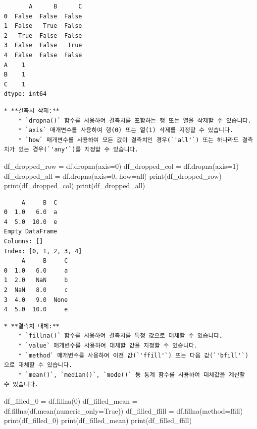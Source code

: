 \documentclass[
  letterpaper,
]{book}
\newenvironment{Shaded}{\begin{snugshade}}{\end{snugshade}}
\newcommand{\BuiltInTok}[1]{\textcolor[rgb]{0.00,0.23,0.31}{#1}}
\newcommand{\DecValTok}[1]{\textcolor[rgb]{0.68,0.00,0.00}{#1}}
\newcommand{\NormalTok}[1]{\textcolor[rgb]{0.00,0.23,0.31}{#1}}
\newcommand{\OperatorTok}[1]{\textcolor[rgb]{0.37,0.37,0.37}{#1}}
\newcommand{\StringTok}[1]{\textcolor[rgb]{0.13,0.47,0.30}{#1}}
\newcommand{\VariableTok}[1]{\textcolor[rgb]{0.07,0.07,0.07}{#1}}
\begin{document}
\begin{verbatim}
       A      B      C
0  False  False  False
1  False   True  False
2   True  False  False
3  False  False   True
4  False  False  False
A    1
B    1
C    1
dtype: int64
\end{verbatim}

\begin{verbatim}
* **결측치 삭제:**
    * `dropna()` 함수를 사용하여 결측치를 포함하는 행 또는 열을 삭제할 수 있습니다.
    * `axis` 매개변수를 사용하여 행(0) 또는 열(1) 삭제를 지정할 수 있습니다.
    * `how` 매개변수를 사용하여 모든 값이 결측치인 경우(`'all'`) 또는 하나라도 결측치가 있는 경우(`'any'`)를 지정할 수 있습니다.
\end{verbatim}

\begin{Shaded}
\begin{Highlighting}[]
\NormalTok{    df\_dropped\_row }\OperatorTok{=}\NormalTok{ df.dropna(axis}\OperatorTok{=}\DecValTok{0}\NormalTok{)}
\NormalTok{    df\_dropped\_col }\OperatorTok{=}\NormalTok{ df.dropna(axis}\OperatorTok{=}\DecValTok{1}\NormalTok{)}
\NormalTok{    df\_dropped\_all }\OperatorTok{=}\NormalTok{ df.dropna(axis}\OperatorTok{=}\DecValTok{0}\NormalTok{, how}\OperatorTok{=}\StringTok{\textquotesingle{}all\textquotesingle{}}\NormalTok{)}
    \BuiltInTok{print}\NormalTok{(df\_dropped\_row)}
    \BuiltInTok{print}\NormalTok{(df\_dropped\_col)}
    \BuiltInTok{print}\NormalTok{(df\_dropped\_all)}
\end{Highlighting}
\end{Shaded}

\begin{verbatim}
     A     B  C
0  1.0   6.0  a
4  5.0  10.0  e
Empty DataFrame
Columns: []
Index: [0, 1, 2, 3, 4]
     A     B     C
0  1.0   6.0     a
1  2.0   NaN     b
2  NaN   8.0     c
3  4.0   9.0  None
4  5.0  10.0     e
\end{verbatim}

\begin{verbatim}
* **결측치 대체:**
    * `fillna()` 함수를 사용하여 결측치를 특정 값으로 대체할 수 있습니다.
    * `value` 매개변수를 사용하여 대체할 값을 지정할 수 있습니다.
    * `method` 매개변수를 사용하여 이전 값(`'ffill'`) 또는 다음 값(`'bfill'`)으로 대체할 수 있습니다.
    * `mean()`, `median()`, `mode()` 등 통계 함수를 사용하여 대체값을 계산할 수 있습니다.
\end{verbatim}

\begin{Shaded}
\begin{Highlighting}[]
\NormalTok{    df\_filled\_0 }\OperatorTok{=}\NormalTok{ df.fillna(}\DecValTok{0}\NormalTok{)}
\NormalTok{    df\_filled\_mean }\OperatorTok{=}\NormalTok{ df.fillna(df.mean(numeric\_only}\OperatorTok{=}\VariableTok{True}\NormalTok{))}
\NormalTok{    df\_filled\_ffill }\OperatorTok{=}\NormalTok{ df.fillna(method}\OperatorTok{=}\StringTok{\textquotesingle{}ffill\textquotesingle{}}\NormalTok{)}
    \BuiltInTok{print}\NormalTok{(df\_filled\_0)}
    \BuiltInTok{print}\NormalTok{(df\_filled\_mean)}
    \BuiltInTok{print}\NormalTok{(df\_filled\_ffill)}
\end{Highlighting}
\end{Shaded}
\end{document}
